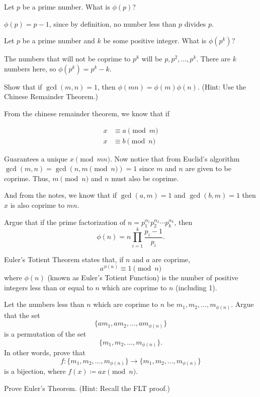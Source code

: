 \documentclass[11pt]{article}
\begin{document}
  \begin{Parts}
    \Part Let $p$ be a prime number. What is $\phi(p)$?

    \begin{solution}
      $\phi(p) = p-1$, since by definition, no number less than $p$ divides $p$.
    \end{solution}

    \Part Let $p$ be a prime number and $k$ be some positive integer. What is $\phi(p^k)$?

    \begin{solution}
      The numbers that will not be coprime to $p^k$ will be $p, p^2, \dots, p^{k}$. There are $k$ numbers here, so $\phi(p^k) = p^k-k$.
    \end{solution}

    \Part Show that if $\gcd(m, n) = 1$, then $\phi(mn) = \phi(m)\phi(n)$. (Hint: Use the Chinese Remainder Theorem.)

    \begin{solution}
      From the chinese remainder theorem, we know that if 

      \begin{align*}
        x &\equiv a \pmod{m}\\
        x &\equiv b \pmod{n} 
      \end{align*}

      Guarantees a unique $x \pmod{mn}$. Now notice that from Euclid's algorithm $\gcd(m, n) = \gcd(n, m \pmod n) = 1$ since $m$ and $n$ are given to be coprime. Thus, $m \pmod n$ and $n$ must also be coprime. 


      And from the notes, we know that if $\gcd(a, m) = 1$ and $\gcd(b, m) = 1$ then $x$ is also coprime to $mn$.
    \end{solution}

    \Part Argue that if the prime factorization of $n = p_1^{\alpha_1} p_2^{\alpha_2} \cdots p_k^{\alpha_k}$, then
    \[ \phi(n) = n \prod_{i = 1}^k \frac{p_i - 1}{p_i}. \]

  \end{Parts}


\pagebreak
{}Euler's Totient Theorem states that, if $n$ and $a$ are coprime,
\[
  a^{\phi(n)} \equiv 1 \pmod{n}
\]
where $\phi(n)$ (known as Euler's Totient Function) is the number of positive
integers less than or equal to $n$ which are coprime to $n$ (including 1).

\begin{Parts}
  \Part Let the numbers less than $n$ which are coprime to $n$ be $m_1, m_2, \ldots, m_{\phi(n)}$. 
  Argue that the set
  \[\{am_1, am_2, \ldots, am_{\phi(n)}\}\]
  is a permutation of the set
  \[\{m_1, m_2, \ldots, m_{\phi(n)}\}.\]
  In other words, prove that 
  \[f:\{m_1, m_2, \ldots, m_{\phi(n)}\} \to \{m_1, m_2, \ldots, m_{\phi(n)}\}\]
  is a bijection, where $f(x) \coloneqq ax \pmod{n}$.

  \Part Prove Euler's Theorem. (Hint: Recall the FLT proof.)
\end{Parts}
\end{document}
